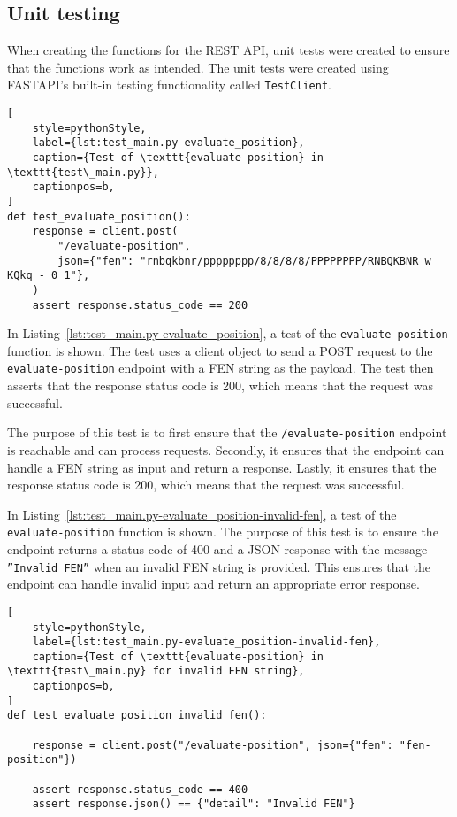 \subsection{Unit testing}\label{subsec:unit-testing}
When creating the functions for the REST API, unit tests were created to ensure that the functions work as intended.
The unit tests were created using FASTAPI's built-in testing functionality called \texttt{TestClient}.

\begin{lstlisting}[
    style=pythonStyle,
    label={lst:test_main.py-evaluate_position},
    caption={Test of \texttt{evaluate-position} in \texttt{test\_main.py}},
    captionpos=b,
]
def test_evaluate_position():
    response = client.post(
        "/evaluate-position",
        json={"fen": "rnbqkbnr/pppppppp/8/8/8/8/PPPPPPPP/RNBQKBNR w KQkq - 0 1"},
    )
    assert response.status_code == 200
\end{lstlisting}

In Listing~\ref{lst:test_main.py-evaluate_position}, a test of the \texttt{evaluate-position} function is shown.
The test uses a client object to send a POST request to the \texttt{evaluate-position} endpoint with a FEN string as
the payload.
The test then asserts that the response status code is 200, which means that the request was successful.

The purpose of this test is to first ensure that the \texttt{/evaluate-position} endpoint is reachable and can process
requests.
Secondly, it ensures that the endpoint can handle a FEN string as input and return a response.
Lastly, it ensures that the response status code is 200, which means that the request was successful.

In Listing~\ref{lst:test_main.py-evaluate_position-invalid-fen}, a test of the \texttt{evaluate-position} function is
shown.
The purpose of this test is to ensure the endpoint returns a status code of 400 and a JSON response with the
message \texttt{''Invalid FEN''} when an invalid FEN string is provided.
This ensures that the endpoint can handle invalid input and return an appropriate error response.

\begin{lstlisting}[
    style=pythonStyle,
    label={lst:test_main.py-evaluate_position-invalid-fen},
    caption={Test of \texttt{evaluate-position} in \texttt{test\_main.py} for invalid FEN string},
    captionpos=b,
]
def test_evaluate_position_invalid_fen():

    response = client.post("/evaluate-position", json={"fen": "fen-position"})

    assert response.status_code == 400
    assert response.json() == {"detail": "Invalid FEN"}
\end{lstlisting}
